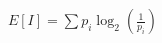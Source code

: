 \documentclass[preview]{standalone}
\begin{document}
\begin{align*}
E[I] = \sum p_i \log_2 \left( \frac{1}{p_i} \right)
\end{align*}
\end{document}
